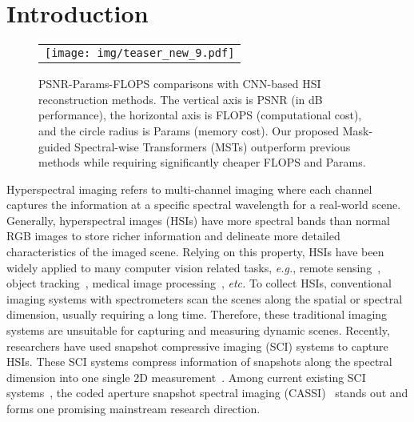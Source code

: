 \documentclass[10pt,twocolumn,letterpaper]{article}
\begin{document}
\section{Introduction}
\vspace{-1mm}
\begin{figure}[h]
	\begin{center}
		\begin{tabular}[t]{c} \hspace{-3.8mm} 
			\texttt{[image: img/teaser\_new\_9.pdf]}
		\end{tabular}
	\end{center}
	\vspace{-8mm}
	\caption{\small PSNR-Params-FLOPS comparisons with CNN-based HSI reconstruction methods. The vertical axis is PSNR (in dB performance), the horizontal axis is FLOPS (computational cost), and the circle radius is Params (memory cost). Our proposed Mask-guided Spectral-wise Transformers (MSTs) outperform previous methods while requiring significantly cheaper FLOPS and Params. }
	\label{fig:teaser}
	\vspace{-5mm}
\end{figure}
Hyperspectral imaging refers to multi-channel imaging where each channel captures the information at a specific spectral wavelength for a real-world scene. Generally, hyperspectral images (HSIs) have more spectral bands than normal RGB images to store richer information and delineate more detailed characteristics of the imaged scene. Relying on this property, HSIs have been widely applied to many computer vision related tasks, \emph{e.g.}, remote sensing~\cite{rs_1,rs_2,rs_3}, object tracking~\cite{ot_1,ot_2}, medical image processing~\cite{mi_1,mi_2,mi_3}, \emph{etc.} To collect HSIs, conventional imaging systems with spectrometers scan the scenes along the spatial or spectral dimension, usually requiring a long time. Therefore, these traditional imaging  systems are unsuitable for capturing and measuring dynamic scenes. Recently, researchers have used snapshot compressive imaging (SCI) systems to capture HSIs. These SCI systems compress information of snapshots along the spectral dimension into one single 2D measurement~\cite{Yuan_review}. Among current existing SCI systems~\cite{sci_1,sci_2,sci_3,sci_5,sci_6}, the coded aperture snapshot spectral imaging (CASSI)~\cite{tsa_net,sci_2} stands out and forms one  promising mainstream research direction.
\end{document}
